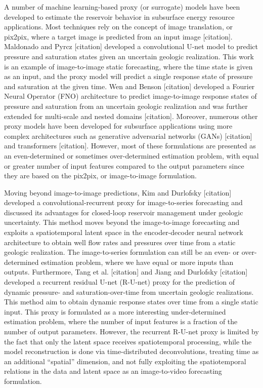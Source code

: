 \documentclass[default,iicol]{sn-jnl}
\begin{document}
A number of machine learning-based proxy (or surrogate) models have been developed to estimate the reservoir behavior in subsurface energy resource applications. Most techniques rely on the concept of image translation, or pix2pix, where a target image is predicted from an input image [citation]. Maldonado and Pyrcz [citation] developed a convolutional U-net model to predict pressure and saturation states given an uncertain geologic realization. This work is an example of image-to-image static forecasting, where the time state is given as an input, and the proxy model will predict a single response state of pressure and saturation at the given time. Wen and Benson [citation] developed a Fourier Neural Operator (FNO) architecture to predict image-to-image response states of pressure and saturation from an uncertain geologic realization and was further extended for multi-scale and nested domains [citation]. Moreover, numerous other proxy models have been developed for subsurface applications using more complex architectures such as generative adversarial networks (GANs) [citation] and transformers [citation]. However, most of these formulations are presented as an even-determined or sometimes over-determined estimation problem, with equal or greater number of input features compared to the output parameters since they are based on the pix2pix, or image-to-image formulation.

Moving beyond image-to-image predictions, Kim and Durlofsky [citation] developed a convolutional-recurrent proxy for image-to-series forecasting and discussed its advantages for closed-loop reservoir management under geologic uncertainty. This method moves beyond the image-to-image forecasting and exploits a spatiotemporal latent space in the encoder-decoder neural network architecture to obtain well flow rates and pressures over time from a static geologic realization. The image-to-series formulation can still be an even- or over-determined estimation problem, where we have equal or more inputs than outputs. Furthermore, Tang et al. [citation] and Jiang and Durlofsky [citation] developed a recurrent residual U-net (R-U-net) proxy for the prediction of dynamic pressure- and saturation-over-time from uncertain geologic realizations. This method aim to obtain dynamic response states over time from a single static input. This proxy is formulated as a more interesting under-determined estimation problem, where the number of input features is a fraction of the number of output parameters. However, the recurrent R-U-net proxy is limited by the fact that only the latent space receives spatiotemporal processing, while the model reconstruction is done via time-distributed deconvolutions, treating time as an additional “spatial” dimension, and not fully exploiting the spatiotemporal relations in the data and latent space as an image-to-video forecasting formulation.
\end{document}
